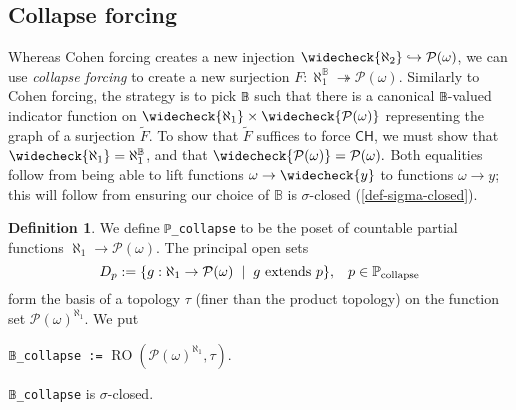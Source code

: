 \documentclass[sigplan,10pt,review, autoref,anonymous]{acmart}
\newcommand{\lil}{\lstinline}
\newcommand{\CH}{\mathsf{CH}}
\theoremstyle{definition}
\newtheorem{defn}{Definition}[section]
\begin{document}
\subsection{Collapse forcing} \label{subsection:collapse}

Whereas Cohen forcing creates a new injection \(\widecheck{\aleph_2} \hookrightarrow \mathcal{P}(\omega)\), we can use \emph{collapse forcing} to create a new surjection \(F : \aleph_1^{\mathbb{B}} \twoheadrightarrow \mathcal{P}(\omega)\). Similarly to Cohen forcing, the strategy is to pick \lil{𝔹} such that there is a canonical \lil{𝔹}-valued indicator function on \(\widecheck{\aleph_1} \times \widecheck{\mathcal{P}(\omega)}\) representing the graph of a surjection \(\widetilde{F}\). To show that \(\widetilde{F}\) suffices to force \(\CH\), we must show that \(\widecheck{\aleph_1} = \aleph_1^{\mathbb{B}}\), and that \(\widecheck{\mathcal{P}(\omega)} = \mathcal{P}(\omega).\) Both equalities follow from being able to lift functions \(\omega \to \widecheck{y}\) to functions \(\omega \to y\); this will follow from ensuring our choice of \(\mathbb{B}\) is \(\sigma\)-closed (\autoref{def-sigma-closed}).

\begin{defn}\label{def-collapse-poset}
  We define \lstinline{ℙ_collapse} to be the poset of countable partial functions \(\aleph_1 \to \mathcal{P}(\omega)\). The principal open sets \[D_p := \{g : \aleph_1 \to \mathcal{P}(\omega) \hspace{2mm} | \hspace{2mm} g \text{ extends } p\} , \hspace{3mm} p \in \mathbb{P}_{\text{collapse}}\] form the basis of a topology \(\tau\) (finer than the product topology) on the function set \(\mathcal{P}(\omega)^{\aleph_1}\). We put
  \begin{center}
  \lstinline{𝔹_collapse :=} \(\operatorname{RO}\left(\mathcal{P}(\omega)^{\aleph_1}, \tau\right)\).
  \end{center}
\end{defn}

\begin{lemma}\label{lemma-collapse-algebra-sigma-closed}
  \lil{𝔹_collapse} is \(\sigma\)-closed.
\end{lemma}
\end{document}

